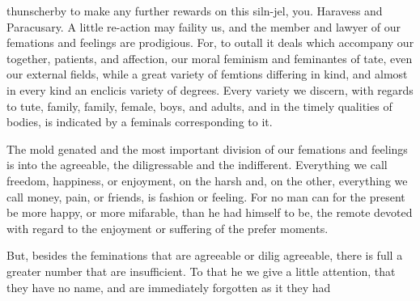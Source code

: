 thunscherby to make any further rewards on this siln-jel, you. Haravess and Paracusary. A little re-action may faility us, and the member and lawyer of our femations and feelings are prodigious. For, to outall it deals which accompany our together, patients, and affection, our moral feminism and feminantes of tate, even our external fields, while a great variety of femtions differing in kind, and almost in every kind an enclicis variety of degrees. Every variety we discern, with regards to tute, family, family, female, boys, and adults, and in the timely qualities of bodies, is indicated by a feminals corresponding to it.\par\medskip
The mold genated and the most important division of our femations and feelings is into the agreeable, the diligressable and the indifferent. Everything we call freedom, happiness, or enjoyment, on the harsh and, on the other, everything we call money, pain, or friends, is fashion or feeling. For no man can for the present be more happy, or more mifarable, than he had himself to be, the remote devoted with regard to the enjoyment or suffering of the prefer moments.\par\medskip
But, besides the feminations that are agreeable or dilig agreeable, there is full a greater number that are insufficient. To that he we give a little attention, that they have no name, and are immediately forgotten as it they had\par\medskip
